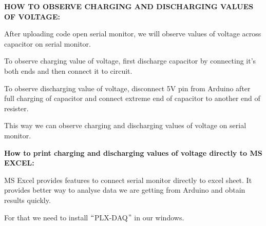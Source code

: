 \documentclass[12pt]{article}
\begin{document}
\vspace{\baselineskip}
{\fontsize{14pt}{16.8pt}\selectfont \textbf{HOW TO OBSERVE CHARGING AND DISCHARGING VALUES OF VOLTAGE:}\par}\par

\vspace{\baselineskip}
{\fontsize{14pt}{16.8pt}\selectfont After uploading code open serial monitor, we will observe values of voltage across capacitor on serial monitor.\par}\par

\vspace{\baselineskip}
{\fontsize{14pt}{16.8pt}\selectfont To observe charging value of voltage, first discharge capacitor by connecting it’s both ends and then connect it to circuit.\par}\par

\vspace{\baselineskip}
{\fontsize{14pt}{16.8pt}\selectfont To observe discharging value of voltage, disconnect 5V pin from Arduino after full charging of capacitor and connect extreme end of capacitor to another end of resister.\par}\par

\vspace{\baselineskip}
{\fontsize{14pt}{16.8pt}\selectfont This way we can observe charging and discharging values of voltage on serial monitor.\par}\par

\vspace{\baselineskip}
{\fontsize{14pt}{16.8pt}\selectfont \textbf{How to print charging and discharging values of voltage directly to MS EXCEL:}\par}\par

\vspace{\baselineskip}
{\fontsize{14pt}{16.8pt}\selectfont MS Excel provides features to connect serial monitor directly to excel sheet. It provides better way to analyse data we are getting from Arduino and obtain results quickly.\par}\par

\vspace{\baselineskip}
{\fontsize{14pt}{16.8pt}\selectfont For that we need to install $``$PLX-DAQ$"$  in our windows.\par}\par
\end{document}
